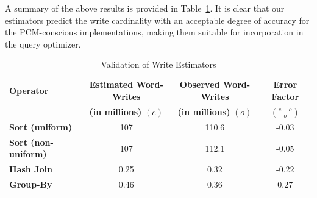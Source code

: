 A summary of the above results is provided in
Table~\ref{tab:estimator_validation}. It is clear that our estimators
predict the write cardinality with an acceptable degree of accuracy for
the PCM-conscious implementations, making them suitable for incorporation
in the query optimizer.

\begin{table}[!h]                                                                                       
\centering                                                                                              
\caption{Validation of Write Estimators}
  \label{tab:estimator_validation}                                                                                
  \begin{small}                                                                                           
  \begin{tabular}{p{3.5cm} c c c}
  \toprule                                                                                                
  
  \textbf{Operator} &  \textbf{Estimated Word-Writes} \;  & \textbf{Observed Word-Writes}  \; & \textbf{Error Factor} \\
                    & \textbf{(in millions)} $(e)$ & \textbf{(in millions)} $(o)$  & $(\frac{e-o}{o})$\\
  \midrule                                                                                                
  
    \textbf{Sort (uniform)} &  107 & 110.6 &  -0.03\\ 
    \textbf{Sort (non-uniform)} &  107 & 112.1 & -0.05\\ 
  \textbf{Hash Join} &  0.25 & 0.32 & -0.22\\ 
  \textbf{Group-By} &  0.46 & 0.36 & 0.27\\ 
  
  \bottomrule                                                                                             
  \end{tabular}                                                                                           
  \end{small}                                                                                             
  \end{table} 

